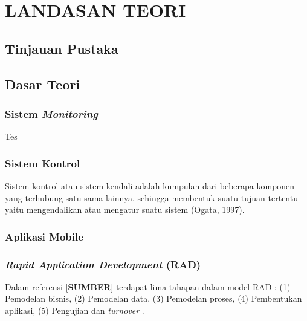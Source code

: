 \chapter{LANDASAN TEORI}

%
\vspace{4.5pt}

\begin{flushleft}
    \section{Tinjauan Pustaka}
    \section{Dasar Teori}
    \begin{justify}
        \subsection{Sistem \textit{Monitoring}}
Tes\\
        

\subsection{Sistem Kontrol}
Sistem kontrol atau
sistem kendali adalah kumpulan dari beberapa komponen yang terhubung satu
sama lainnya, sehingga membentuk suatu tujuan tertentu yaitu mengendalikan
atau mengatur suatu sistem (Ogata, 1997). 
\\

        \subsection{Aplikasi Mobile}

        \subsection{\textit{Rapid Application Development} (RAD)}
        Dalam referensi [\textbf{SUMBER}] terdapat lima tahapan dalam model RAD : (1) Pemodelan bisnis, (2) Pemodelan data, (3) Pemodelan proses, (4) Pembentukan aplikasi, (5) Pengujian dan \textit{turnover} .
        
        \begin{figure}[ht]
            \centering
           

\end{figure}
\end{justify}
\end{flushleft}
